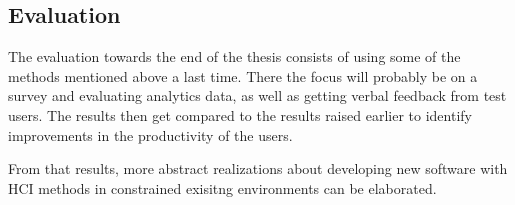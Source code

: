 \subsection{Evaluation}
\label{subsec:evaluation}

The evaluation towards the end of the thesis consists of using some of the methods mentioned above a last time. There the focus will probably be on a survey and evaluating analytics data, as well as getting verbal feedback from test users.
The results then get compared to the results raised earlier to identify improvements in the productivity of the users.

From that results, more abstract realizations about developing new software with HCI methods in constrained exisitng environments can be elaborated.
